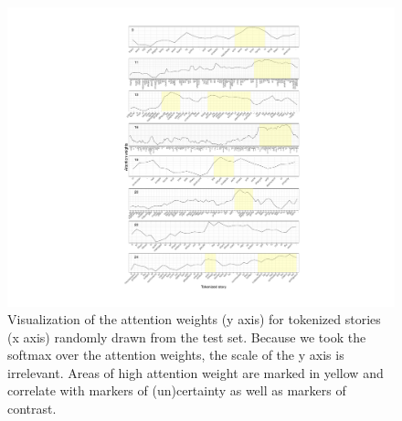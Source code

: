 \documentclass[11pt,a4paper]{article}
\begin{document}
\begin{figure}[!htb]
	\includegraphics[width=\linewidth]{graphs/attention-viz-appendix-marked.pdf}
	\caption{Visualization of the attention weights (y axis) for tokenized stories (x axis) randomly drawn from the test set. Because we took the softmax over the attention weights, the scale of the y axis is irrelevant. Areas of high attention weight are marked in yellow and correlate with markers of (un)certainty as well as markers of contrast.}
	\label{fig:app-attention-viz}
\end{figure}
\end{document}
